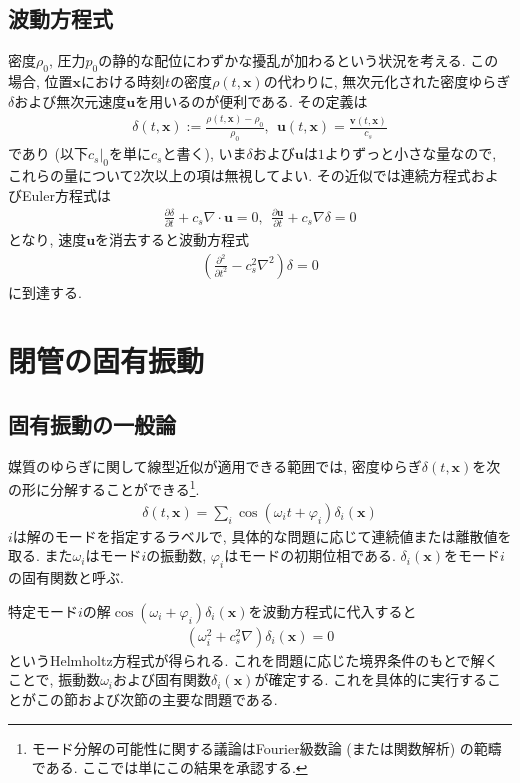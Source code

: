 \documentclass[a4paper,uplatex,dvipdfmx]{jsarticle}
\newcommand{\x}{\bm{x}}
\renewcommand{\v}{\bm{v}}
\renewcommand{\u}{\bm{u}}
\begin{document}
\subsection{波動方程式}\label{sec: wave equation}

密度$\rho_0$, 圧力$p_0$の静的な配位にわずかな擾乱が加わるという状況を考える.
この場合, 位置$\x$における時刻$t$の密度$\rho ( t, \x )$の代わりに, 無次元化された密度ゆらぎ$\delta$および無次元速度$\u$を用いるのが便利である. その定義は
\begin{align}
	\delta ( t, \x ) := \frac{ \rho ( t, \x ) - \rho_0 }{ \rho_0 } , \ \ \u ( t, \x ) = \frac{ \v ( t, \x ) }{ c_s }
\end{align}
であり (以下$c_s |_0$を単に$c_s$と書く), いま$\delta$および$\u$は$1$よりずっと小さな量なので, これらの量について$2$次以上の項は無視してよい.
その近似では連続方程式およびEuler方程式は
\begin{align}
	\frac{ \partial \delta }{ \partial t } + c_s \nabla \cdot \u = 0 , \ \
	\frac{ \partial \u }{ \partial t } + c_s \nabla \delta = 0 \label{euler}
\end{align}
となり, 速度$\u$を消去すると波動方程式
\begin{align}
	\left( \frac{ \partial^2 }{ \partial t^2} - c_s^2 \nabla^2 \right) \delta = 0
\end{align}
に到達する.


\section{閉管の固有振動}

\subsection{固有振動の一般論}

媒質のゆらぎに関して線型近似が適用できる範囲では, 密度ゆらぎ$\delta ( t, \x )$を次の形に分解することができる\footnote{モード分解の可能性に関する議論はFourier級数論
(または関数解析) の範疇である. ここでは単にこの結果を承認する.}.
\begin{align}
	\delta ( t, \x ) = \sum_i \cos ( \omega_i t + \varphi_i ) \delta_i ( \x )
\end{align}
$i$は解のモードを指定するラベルで, 具体的な問題に応じて連続値または離散値を取る.
また$\omega_i$はモード$i$の振動数, $\varphi_i$はモードの初期位相である. $\delta_i ( \x )$をモード$i$の固有関数と呼ぶ.

特定モード$i$の解$\cos ( \omega_i + \varphi_i ) \delta_i ( \x )$を波動方程式に代入すると
\begin{align}
	( \omega_i^2 + c_s^2 \nabla ) \delta_i ( \x ) = 0 \label{helmholtz}
\end{align}
というHelmholtz方程式が得られる. これを問題に応じた境界条件のもとで解くことで,
振動数$\omega_i$および固有関数$\delta_i ( \x )$が確定する. これを具体的に実行することがこの節および次節の主要な問題である.
\end{document}
